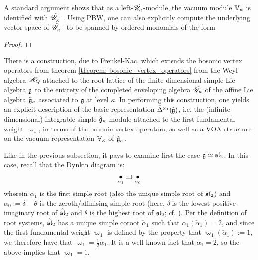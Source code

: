         A standard argument shows that as a left-$\tilde{\scrU}_{\kappa}$-module, the vacuum module $\V_{\kappa}$ is identified with $\tilde{\scrU}_{\kappa}^-$. Using PBW, one can also explicitly compute the underlying vector space of $\tilde{\scrU}_{\kappa}^-$ to be spanned by ordered monomials of the form

        \begin{theorem} \label{theorem: bosonic_vertex_operators}
            
        \end{theorem}
            \begin{proof}
                
            \end{proof}
    
        There is a construction, due to Frenkel-Kac, which extends the bosonic vertex operators from theorem \ref{theorem: bosonic_vertex_operators} from the Weyl algebra $\tilde{\scrH}_Q$ attached to the root lattice of the finite-dimensional simple Lie algebra $\g$ to the entirety of the completed enveloping algebra $\tilde{\scrU}_{\kappa}$ of the affine Lie algebra $\tilde{\g}_{\kappa}$ associated to $\g$ at level $\kappa$. In performing this construction, one yields an explicit description of the basic representation $\simple^{\omega_1}(\hat{\g})$, i.e. the (infinite-dimensional) integrable simple $\hat{\g}_{\kappa}$-module attached to the first fundamental weight $\varpi_1$, in terms of the bosonic vertex operators, as well as a VOA structure on the vacuum representation $\V_{\kappa}$ of $\tilde{\g}_{\kappa}$.

        Like in the previous subsection, it pays to examine first the case $\g \cong \sl_2$. In this case, recall that the Dynkin diagram is:
            $$\underset{\alpha_1}{\bullet} \toto \underset{\alpha_0}{\bullet}$$
        wherein $\alpha_1$ is the first simple root (also the unique simple root of $\sl_2$) and $\alpha_0 := \delta - \theta$ is the zeroth/affinising simple root (here, $\delta$ is the lowest positive imaginary root of $\hat{\sl}_2$ and $\theta$ is the highest root of $\sl_2$; cf. \cite[Chapters 6 and 7]{kac_infinite_dimensional_lie_algebras}). Per the definition of root systems, $\hat{\sl}_2$ has a unique simple coroot $\check{\alpha}_1$ such that $\alpha_1(\check{\alpha}_1) = 2$, and since the first fundamental weight $\varpi_1$ is defined by the property that $\varpi_1(\check{\alpha}_1) := 1$, we therefore have that $\varpi_1 = \frac12 \alpha_1$. It is a well-known fact that $\alpha_1 = 2$, so the above implies that $\varpi_1 = 1$.
            
